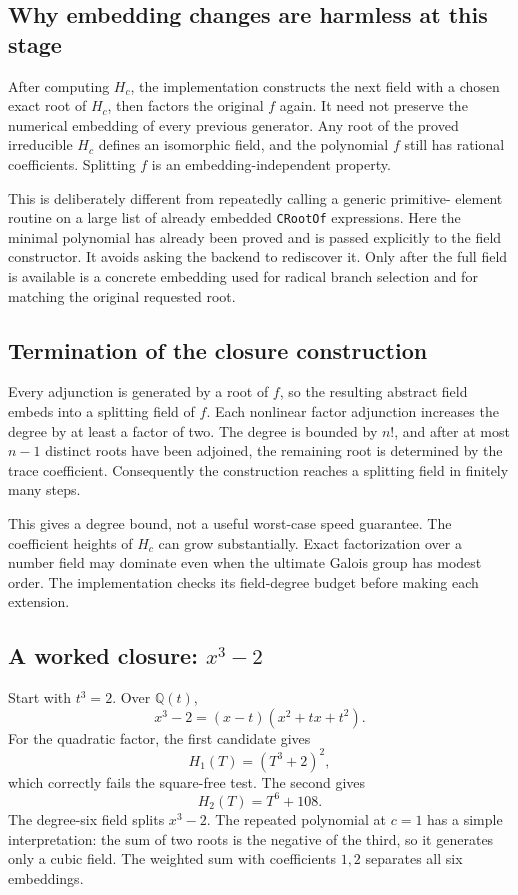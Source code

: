\documentclass[11pt]{article}
\theoremstyle{definition}\newtheorem{definition}[theorem]{Definition}
\theoremstyle{remark}\newtheorem{remark}[theorem]{Remark}
\newcommand{\Q}{\mathbb Q}\newcommand{\C}{\mathbb C}\newcommand{\Z}{\mathbb Z}
\newcommand{\code}[1]{\texttt{#1}}
\begin{document}
\subsection{Why embedding changes are harmless at this stage}

After computing $H_c$, the implementation constructs the next field with a
chosen exact root of $H_c$, then factors the original $f$ again. It need not
preserve the numerical embedding of every previous generator. Any root of the
proved irreducible $H_c$ defines an isomorphic field, and the polynomial $f$
still has rational coefficients. Splitting $f$ is an embedding-independent
property.

This is deliberately different from repeatedly calling a generic primitive-
element routine on a large list of already embedded \code{CRootOf} expressions.
Here the minimal polynomial has already been proved and is passed explicitly
to the field constructor. It avoids asking the backend to rediscover it.
Only after the full field is available is a concrete embedding used for radical
branch selection and for matching the original requested root.

\subsection{Termination of the closure construction}

Every adjunction is generated by a root of $f$, so the resulting abstract field
embeds into a splitting field of $f$. Each nonlinear factor adjunction increases
the degree by at least a factor of two. The degree is bounded by $n!$, and after
at most $n-1$ distinct roots have been adjoined, the remaining root is determined
by the trace coefficient. Consequently the construction reaches a splitting
field in finitely many steps.

This gives a degree bound, not a useful worst-case speed guarantee. The
coefficient heights of $H_c$ can grow substantially. Exact factorization over a
number field may dominate even when the ultimate Galois group has modest order.
The implementation checks its field-degree budget before making each extension.

\subsection{A worked closure: \texorpdfstring{$x^3-2$}{x cubed minus two}}

Start with $t^3=2$. Over $\Q(t)$,
\begin{equation}
 x^3-2=(x-t)(x^2+tx+t^2).
\end{equation}
For the quadratic factor, the first candidate gives
\begin{equation}
 H_1(T)=(T^3+2)^2,
\end{equation}
which correctly fails the square-free test. The second gives
\begin{equation}
 H_2(T)=T^6+108.
\end{equation}
The degree-six field splits $x^3-2$. The repeated polynomial at $c=1$ has a
simple interpretation: the sum of two roots is the negative of the third,
so it generates only a cubic field. The weighted sum with coefficients $1,2$
separates all six embeddings.
\end{document}
